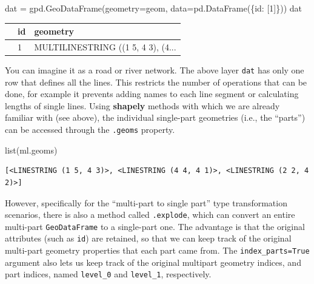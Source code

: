 \documentclass[
  letterpaper,
]{krantz}
\newenvironment{Shaded}{\begin{snugshade}}{\end{snugshade}}
\newcommand{\BuiltInTok}[1]{\textcolor[rgb]{0.00,0.23,0.31}{#1}}
\newcommand{\DecValTok}[1]{\textcolor[rgb]{0.68,0.00,0.00}{#1}}
\newcommand{\NormalTok}[1]{\textcolor[rgb]{0.00,0.23,0.31}{#1}}
\newcommand{\OperatorTok}[1]{\textcolor[rgb]{0.37,0.37,0.37}{#1}}
\newcommand{\StringTok}[1]{\textcolor[rgb]{0.13,0.47,0.30}{#1}}
\begin{document}
\begin{Shaded}
\begin{Highlighting}[]
\NormalTok{dat }\OperatorTok{=}\NormalTok{ gpd.GeoDataFrame(geometry}\OperatorTok{=}\NormalTok{geom, data}\OperatorTok{=}\NormalTok{pd.DataFrame(\{}\StringTok{\textquotesingle{}id\textquotesingle{}}\NormalTok{: [}\DecValTok{1}\NormalTok{]\}))}
\NormalTok{dat}
\end{Highlighting}
\end{Shaded}

\begin{longtable}[]{@{}lll@{}}
\toprule\noalign{}
& id & geometry \\
\midrule\noalign{}
\endhead
\bottomrule\noalign{}
\endlastfoot
0 & 1 & MULTILINESTRING ((1 5, 4 3), (4... \\
\end{longtable}

You can imagine it as a road or river network. The above layer
\texttt{dat} has only one row that defines all the lines. This restricts
the number of operations that can be done, for example it prevents
adding names to each line segment or calculating lengths of single
lines. Using \textbf{shapely} methods with which we are already familiar
with (see above), the individual single-part geometries (i.e., the
``parts'') can be accessed through the \texttt{.geoms} property.

\begin{Shaded}
\begin{Highlighting}[]
\BuiltInTok{list}\NormalTok{(ml.geoms)}
\end{Highlighting}
\end{Shaded}

\begin{verbatim}
[<LINESTRING (1 5, 4 3)>, <LINESTRING (4 4, 4 1)>, <LINESTRING (2 2, 4 2)>]
\end{verbatim}

However, specifically for the ``multi-part to single part'' type
transformation scenarios, there is also a method called
\texttt{.explode}, which can convert an entire multi-part
\texttt{GeoDataFrame} to a single-part one. The advantage is that the
original attributes (such as \texttt{id}) are retained, so that we can
keep track of the original multi-part geometry properties that each part
came from. The \texttt{index\_parts=True} argument also lets us keep
track of the original multipart geometry indices, and part indices,
named \texttt{level\_0} and \texttt{level\_1}, respectively.
\end{document}

